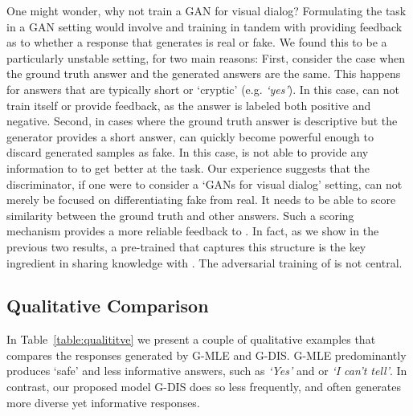 \documentclass{article}
\newcommand{\myquote}[1]{\emph{`#1'}}
\begin{document}
One might wonder, why not train a GAN for visual dialog? Formulating the task in a GAN setting would involve  and   
training in tandem with  providing feedback as to  whether a response that  generates is real or fake.  We found this to be a particularly unstable setting, for two main reasons: 
First, consider the case when the ground truth answer and the generated answers are the same. This happens for answers that are typically  short or `cryptic' 
(e.g. \myquote{yes}). In this case,  can not train itself or provide 
feedback, as the answer is labeled both positive and negative. Second, in cases where the  ground truth answer is descriptive but the generator provides a short answer,  can  quickly become powerful enough to discard generated samples as fake. In this case,  is  not able to provide any information to  to get better at the task.  
Our experience suggests that the discriminator, if one were to consider a `GANs for visual dialog' setting, can not merely be focused on differentiating fake from real. It  needs to be able to score similarity between the ground truth and other answers. Such a scoring mechanism provides a more reliable feedback to .  In fact, as we show in the previous two results, a pre-trained  that captures this structure is the key ingredient in sharing knowledge with . The adversarial training of  is not central. 
\subsection{Qualitative Comparison}
\label{sec:quality-result}
In Table~\ref{table:qualititve} we present a couple of qualitative examples that compares the responses generated by G-MLE and G-DIS. G-MLE predominantly 
produces `safe' and less informative answers, such as \myquote{Yes} and or \myquote{I can't tell}. In contrast, our proposed model G-DIS does so less frequently, and often generates more diverse yet informative responses.
\end{document}
